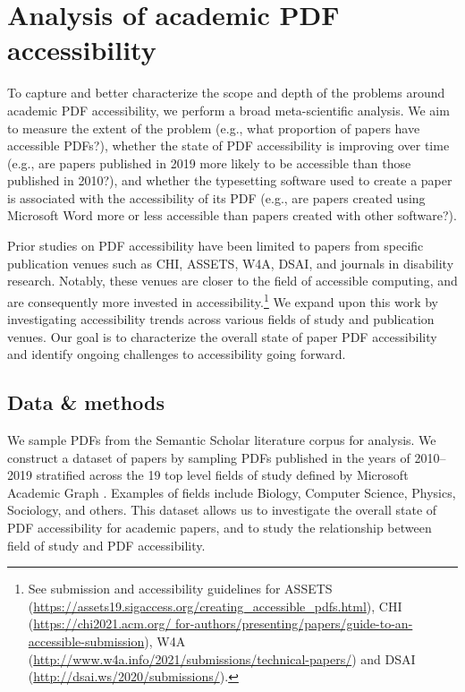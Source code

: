 \section{Analysis of academic PDF accessibility}
\label{sec:sos}

To capture and better characterize the scope and depth of the problems around academic PDF accessibility, we perform a broad meta-scientific analysis. We aim to measure the extent of the problem (e.g., what proportion of papers have accessible PDFs?), whether the state of PDF accessibility is improving over time (e.g., are papers published in 2019 more likely to be accessible than those published in 2010?), and whether the typesetting software used to create a paper is associated with the accessibility of its PDF (e.g., are papers created using Microsoft Word more or less accessible than papers created with other software?).

Prior studies on PDF accessibility have been limited to papers from specific publication venues such as CHI, ASSETS, W4A, DSAI, and journals in disability research. Notably, these venues are closer to the field of accessible computing, and are consequently more invested in accessibility.\footnote{See submission and accessibility guidelines for ASSETS (\href{https://assets19.sigaccess.org/creating_accessible_pdfs.html}{https://assets19.sigaccess.org/creating\_accessible\_pdfs.html}), CHI (\href{https://chi2021.acm.org/for-authors/presenting/papers/guide-to-an-accessible-submission}{https://chi2021.acm.org/ for-authors/presenting/papers/guide-to-an-accessible-submission}), W4A (\href{http://www.w4a.info/2021/submissions/technical-papers/}{http://www.w4a.info/2021/submissions/technical-papers/}) and DSAI (\href{http://dsai.ws/2020/submissions/}{http://dsai.ws/2020/submissions/}).}  We expand upon this work by investigating accessibility trends across various fields of study and publication venues. Our goal is to characterize the overall state of paper PDF accessibility and identify ongoing challenges to accessibility going forward.

\subsection{Data \& methods}\label{subsec:data-methods}

We sample PDFs from the Semantic Scholar literature corpus \citep{Ammar2018ConstructionOT} for analysis. We construct a dataset of papers by sampling PDFs published in the years of 2010--2019 stratified across the 19 top level fields of study defined by Microsoft Academic Graph \citep{msr:mag1, Shen2018AWS}. Examples of fields include Biology, Computer Science, Physics, Sociology, and others. This dataset allows us to investigate the overall state of PDF accessibility for academic papers, and to study the relationship between field of study and PDF accessibility. 

